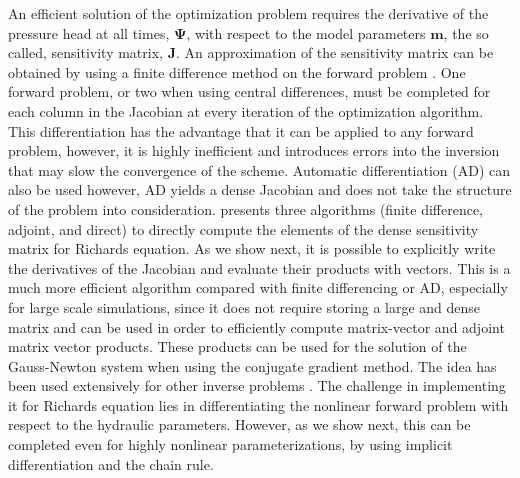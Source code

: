 \documentclass[11pt]{article}
\newcommand{\bfJ}{\mathbf{J}}
\newcommand{\bfm}{\mathbf{m}}
\newcommand{\bfPsi}{\boldsymbol{\Psi}}
\begin{document}
An efficient solution of the optimization problem requires
the derivative of the pressure head at all times, $\bfPsi$, with respect to the model parameters $\bfm$,
the so called, sensitivity matrix, $\bfJ$.
An approximation of the sensitivity matrix
can be obtained by using a finite difference method on the forward
problem \citep{Simunek1996,Finsterle2011,Finsterle2011c}. One forward problem,
or two when using central differences, must be completed for each column in
the Jacobian at every iteration of the optimization algorithm. This
differentiation has the advantage that it can be applied to any forward
problem, however, it is highly inefficient and introduces errors into the
inversion that may slow the convergence of the scheme. Automatic differentiation
(AD) can also be used \citep{nw} however, AD yields a dense Jacobian and does
not take the structure of the problem into consideration.
\cite{Bitterlich2002} presents three algorithms (finite difference, adjoint, and direct) to
directly compute the elements of the dense sensitivity matrix for Richards equation.
As we show next, it is possible to
explicitly write the derivatives of the Jacobian and evaluate their products with vectors.
This is a much more efficient
algorithm compared with finite differencing or AD, especially for large scale simulations, since it does not require storing
a large and dense matrix and can be used in order to efficiently compute matrix-vector
and adjoint matrix vector products.
These products can be used for the solution of the Gauss-Newton system when using the conjugate gradient method.
The idea has been used extensively for other inverse problems \citep{hao}. The challenge in
implementing it for Richards equation lies in differentiating the nonlinear forward problem with respect
to the hydraulic parameters. However, as we show next, this can be completed even for
highly nonlinear parameterizations, by using implicit differentiation and the chain rule.

\bigskip
\end{document}
